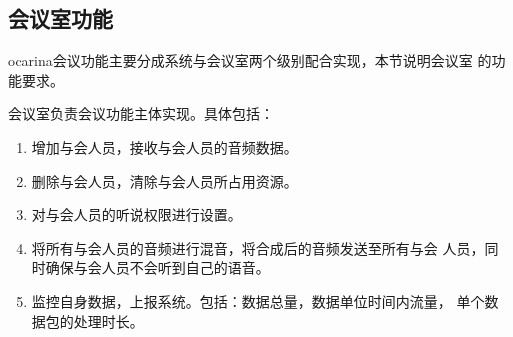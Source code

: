 \documentclass[11pt]{article}
\begin{document}
\subsection{会议室功能}
    ocarina会议功能主要分成系统与会议室两个级别配合实现，本节说明会议室
的功能要求。
    
    会议室负责会议功能主体实现。具体包括：
    \begin{enumerate}
        \item 增加与会人员，接收与会人员的音频数据。
        \item 删除与会人员，清除与会人员所占用资源。
        \item 对与会人员的听说权限进行设置。
        \item 将所有与会人员的音频进行混音，将合成后的音频发送至所有与会
            人员，同时确保与会人员不会听到自己的语音。
        \item 监控自身数据，上报系统。包括：数据总量，数据单位时间内流量，
            单个数据包的处理时长。
    \end{enumerate}
\end{document}
